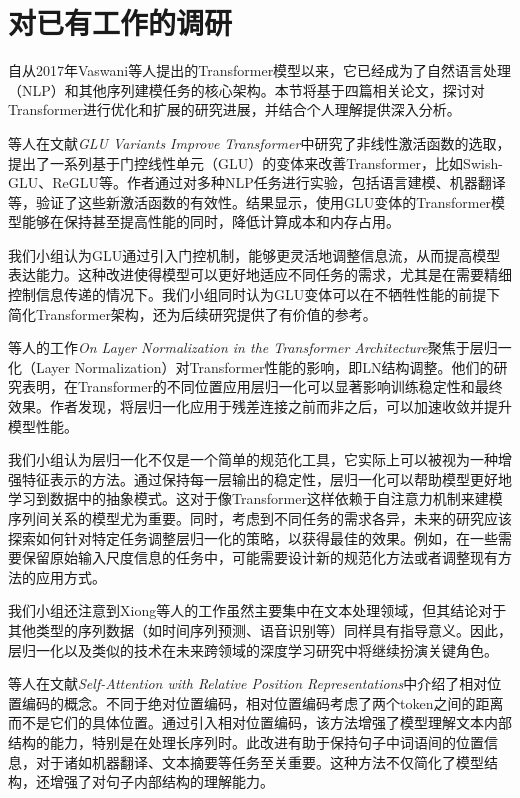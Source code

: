 \section{对已有工作的调研}\label{sec-2}
自从2017年Vaswani等人提出的Transformer模型以来，它已经成为了自然语言处理（NLP）和其他序列建模任务的核心架构。本节将基于四篇相关论文，探讨对Transformer进行优化和扩展的研究进展，并结合个人理解提供深入分析。
	
\citeauthor{shazeerGLUVariantsImprove2020}等人在文献\textit{GLU Variants Improve Transformer}中研究了非线性激活函数的选取，提出了一系列基于门控线性单元（GLU）的变体来改善Transformer，比如Swish-GLU、ReGLU等。作者通过对多种NLP任务进行实验，包括语言建模、机器翻译等，验证了这些新激活函数的有效性。结果显示，使用GLU变体的Transformer模型能够在保持甚至提高性能的同时，降低计算成本和内存占用。
	
我们小组认为GLU通过引入门控机制，能够更灵活地调整信息流，从而提高模型表达能力。这种改进使得模型可以更好地适应不同任务的需求，尤其是在需要精细控制信息传递的情况下。我们小组同时认为GLU变体可以在不牺牲性能的前提下简化Transformer架构，还为后续研究提供了有价值的参考。
	
\citeauthor{xiongLayerNormalizationTransformer2020}等人的工作\textit{On Layer Normalization in the Transformer Architecture}聚焦于层归一化（Layer Normalization）对Transformer性能的影响，即LN结构调整。他们的研究表明，在Transformer的不同位置应用层归一化可以显著影响训练稳定性和最终效果。作者发现，将层归一化应用于残差连接之前而非之后，可以加速收敛并提升模型性能。
	
我们小组认为层归一化不仅是一个简单的规范化工具，它实际上可以被视为一种增强特征表示的方法。通过保持每一层输出的稳定性，层归一化可以帮助模型更好地学习到数据中的抽象模式。这对于像Transformer这样依赖于自注意力机制来建模序列间关系的模型尤为重要。同时，考虑到不同任务的需求各异，未来的研究应该探索如何针对特定任务调整层归一化的策略，以获得最佳的效果。例如，在一些需要保留原始输入尺度信息的任务中，可能需要设计新的规范化方法或者调整现有方法的应用方式。
	
我们小组还注意到Xiong等人的工作虽然主要集中在文本处理领域，但其结论对于其他类型的序列数据（如时间序列预测、语音识别等）同样具有指导意义。因此，层归一化以及类似的技术在未来跨领域的深度学习研究中将继续扮演关键角色。
	
\citeauthor{shawSelfAttentionRelativePosition2018}等人在文献\textit{Self-Attention with Relative Position Representations}中介绍了相对位置编码的概念。不同于绝对位置编码，相对位置编码考虑了两个token之间的距离而不是它们的具体位置。通过引入相对位置编码，该方法增强了模型理解文本内部结构的能力，特别是在处理长序列时。此改进有助于保持句子中词语间的位置信息，对于诸如机器翻译、文本摘要等任务至关重要。这种方法不仅简化了模型结构，还增强了对句子内部结构的理解能力。
	
